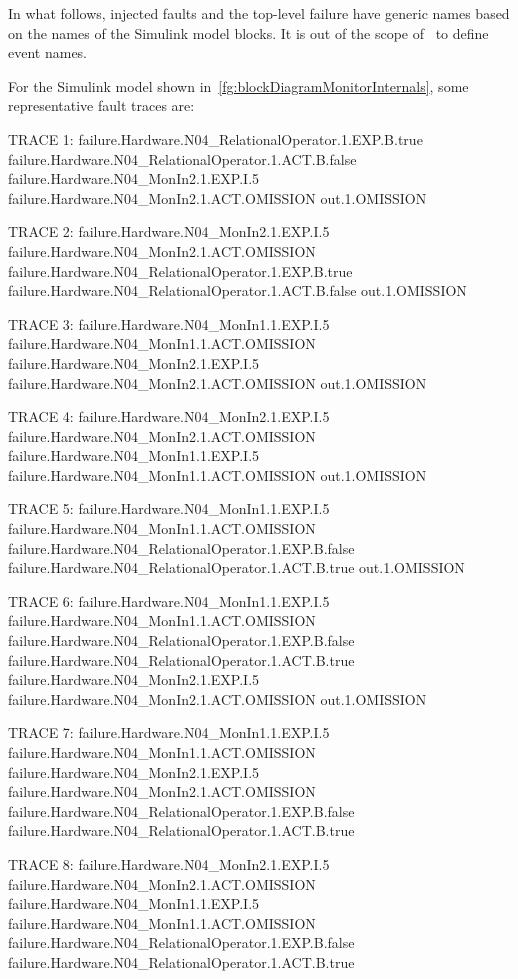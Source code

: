 \documentclass[12pt,openright,twoside,a4paper,oldfontcommands,english,brazil,final]{abntex2}
\theoremstyle{theo}
\newenvironment{snippetcspm}[1][2]
{
\ifthenelse{\equal{#1}{0}}
    {\tiny}
    {
    \ifthenelse{\equal{#1}{1}}
        {\scriptsize}
        {
        \ifthenelse{\equal{#1}{2}}
            {\footnotesize}
            {\small}
        }
    }
\verbatim
}
{
\endverbatim
}
\newcommand{\simulink}{Simulink\xspace}
\begin{document}
In what follows, injected faults and the top-level failure have generic names based on the names of the \simulink model blocks.
It is out of the scope of~\cite{DM2012} to define event names.

For the \simulink model shown in~\cref{fg:blockDiagramMonitorInternals}, some representative fault traces are:

\begin{snippetcspm}[1]
TRACE 1:
failure.Hardware.N04_RelationalOperator.1.EXP.B.true
failure.Hardware.N04_RelationalOperator.1.ACT.B.false
failure.Hardware.N04_MonIn2.1.EXP.I.5
failure.Hardware.N04_MonIn2.1.ACT.OMISSION
out.1.OMISSION

TRACE 2:
failure.Hardware.N04_MonIn2.1.EXP.I.5
failure.Hardware.N04_MonIn2.1.ACT.OMISSION
failure.Hardware.N04_RelationalOperator.1.EXP.B.true
failure.Hardware.N04_RelationalOperator.1.ACT.B.false
out.1.OMISSION

TRACE 3:
failure.Hardware.N04_MonIn1.1.EXP.I.5
failure.Hardware.N04_MonIn1.1.ACT.OMISSION
failure.Hardware.N04_MonIn2.1.EXP.I.5
failure.Hardware.N04_MonIn2.1.ACT.OMISSION
out.1.OMISSION

TRACE 4:
failure.Hardware.N04_MonIn2.1.EXP.I.5
failure.Hardware.N04_MonIn2.1.ACT.OMISSION
failure.Hardware.N04_MonIn1.1.EXP.I.5
failure.Hardware.N04_MonIn1.1.ACT.OMISSION
out.1.OMISSION

TRACE 5:
failure.Hardware.N04_MonIn1.1.EXP.I.5
failure.Hardware.N04_MonIn1.1.ACT.OMISSION
failure.Hardware.N04_RelationalOperator.1.EXP.B.false
failure.Hardware.N04_RelationalOperator.1.ACT.B.true
out.1.OMISSION

TRACE 6:
failure.Hardware.N04_MonIn1.1.EXP.I.5
failure.Hardware.N04_MonIn1.1.ACT.OMISSION
failure.Hardware.N04_RelationalOperator.1.EXP.B.false
failure.Hardware.N04_RelationalOperator.1.ACT.B.true
failure.Hardware.N04_MonIn2.1.EXP.I.5
failure.Hardware.N04_MonIn2.1.ACT.OMISSION
out.1.OMISSION

TRACE 7:
failure.Hardware.N04_MonIn1.1.EXP.I.5
failure.Hardware.N04_MonIn1.1.ACT.OMISSION
failure.Hardware.N04_MonIn2.1.EXP.I.5
failure.Hardware.N04_MonIn2.1.ACT.OMISSION
failure.Hardware.N04_RelationalOperator.1.EXP.B.false
failure.Hardware.N04_RelationalOperator.1.ACT.B.true

TRACE 8:
failure.Hardware.N04_MonIn2.1.EXP.I.5
failure.Hardware.N04_MonIn2.1.ACT.OMISSION
failure.Hardware.N04_MonIn1.1.EXP.I.5
failure.Hardware.N04_MonIn1.1.ACT.OMISSION
failure.Hardware.N04_RelationalOperator.1.EXP.B.false
failure.Hardware.N04_RelationalOperator.1.ACT.B.true


\end{snippetcspm}
\end{document}
